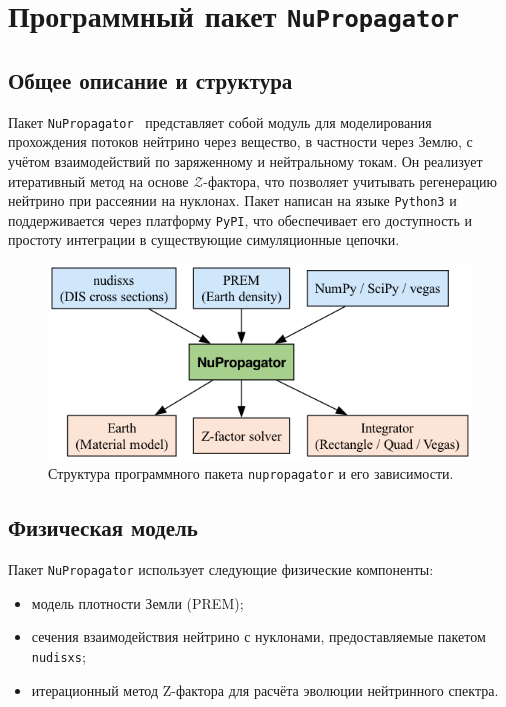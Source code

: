 \section{Программный пакет \texttt{NuPropagator}}

\subsection{Общее описание и структура}

Пакет \texttt{NuPropagator}~\cite{nupropagator2022} представляет собой модуль для моделирования прохождения потоков нейтрино через вещество, в частности через Землю, с учётом взаимодействий по заряженному и нейтральному токам. Он реализует итеративный метод на основе $\mathcal{Z}$-фактора, что позволяет учитывать регенерацию нейтрино при рассеянии на нуклонах. Пакет написан на языке \texttt{Python3} и поддерживается через платформу \texttt{PyPI}, что обеспечивает его доступность и простоту интеграции в существующие симуляционные цепочки.

\begin{figure}[!h]
\centering
\includegraphics[width=\linewidth]{images/nupropagator_diagram.png}
\caption{Структура программного пакета \texttt{nupropagator} и его зависимости.}
\label{fig:nudisxs1}
\end{figure}

\subsection{Физическая модель}

Пакет \texttt{NuPropagator} использует следующие физические компоненты:
\begin{itemize}
  \item модель плотности Земли (PREM);
  \item сечения взаимодействия нейтрино с нуклонами, предоставляемые пакетом \texttt{nudisxs};
  \item итерационный метод Z-фактора для расчёта эволюции нейтринного спектра.
\end{itemize}


